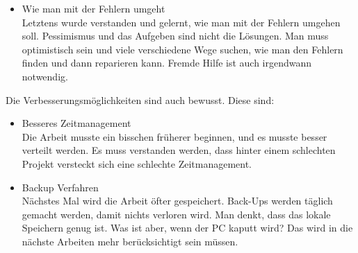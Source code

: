 \begin{itemize}
	\item Wie man mit der Fehlern umgeht \\
	
	Letztens wurde verstanden und gelernt, wie man mit der Fehlern umgehen soll. Pessimismus und das Aufgeben sind nicht die Lösungen. Man muss optimistisch sein und viele verschiedene Wege suchen, wie man den Fehlern finden und dann reparieren kann. Fremde Hilfe ist auch irgendwann notwendig.
\end{itemize}	
	Die Verbesserungsmöglichkeiten sind auch bewusst. Diese sind: 
\begin{itemize}	
	
	\item Besseres Zeitmanagement \\
	
	Die Arbeit musste ein bisschen früherer beginnen, und es musste besser verteilt werden. Es muss verstanden werden, dass hinter einem schlechten Projekt versteckt sich eine schlechte Zeitmanagement.
	\item Backup Verfahren \\
	
	Nächstes Mal wird die Arbeit öfter gespeichert. Back-Ups werden täglich gemacht werden, damit nichts verloren wird. Man denkt, dass das lokale Speichern genug ist. Was ist aber, wenn der PC kaputt wird? Das wird in die nächste Arbeiten mehr berücksichtigt sein müssen.
\end{itemize}

